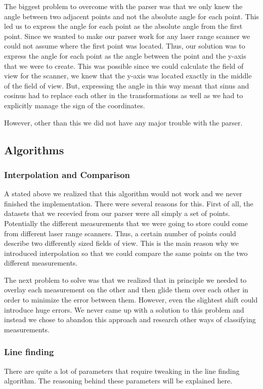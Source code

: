 \documentclass[a4paper, 10pt, conference]{ieeeconf}      %
\begin{document}
The biggest problem to overcome with the parser was that we only knew the angle between two adjacent points and not the absolute angle for each point. This led us to express the angle for each point as the absolute angle from the first point. Since we wanted to make our parser work for any laser range scanner we could not assume where the first point was located. Thus, our solution was to express the angle for each point as the angle between the point and the y-axis that we were to create. This was possible since we could calculate the field of view for the scanner, we knew that the y-axis was located exactly in the middle of the field of view. But, expressing the angle in this way meant that sinus and cosinus had to replace each other in the transformations as well as we had to explicitly manage the sign of the coordinates.

However, other than this we did not have any major trouble with the parser.

\subsection{Algorithms}

\subsubsection{Interpolation and Comparison}
A stated above we realized that this algorithm would not work and we never finished the implementation. There were several reasons for this. First of all, the datasets that we recevied from our parser were all simply a set of points. Potentially the different measurements that we were going to store could come from different laser range scanners. Thus, a certain number of points could describe two differently sized fields of view. This is the main reason why we introduced interpolation so that we could compare the same points on the two different measurements.

The next problem to solve was that we realized that in principle we needed to overlay each measurement on the other and then glide them over each other in order to minimize the error between them. However, even the slightest shift could introduce huge errors. We never came up with a solution to this problem and instead we chose to abandon this approach and research other ways of classifying measurements.

\subsubsection{Line finding}
There are quite a lot of parameters that require tweaking in the line finding algorithm. The reasoning behind these parameters will be explained here.
\end{document}
